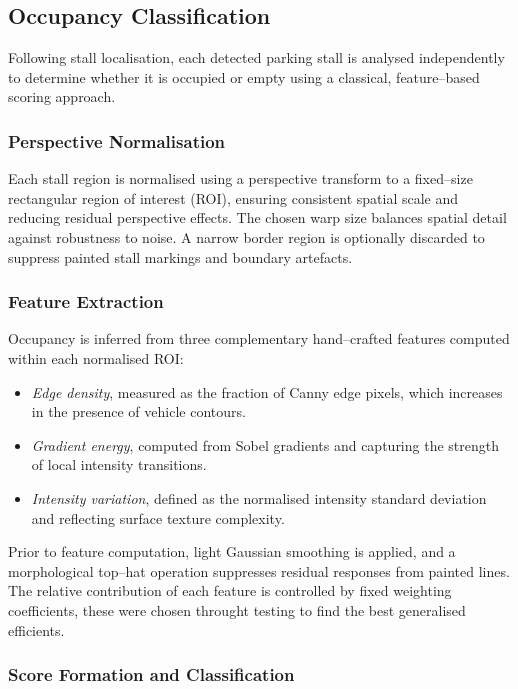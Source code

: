\documentclass[9pt,journal]{IEEEtran}
\begin{document}
	\subsection{Occupancy Classification}
	\label{sec:occupancy}
	
	Following stall localisation, each detected parking stall is analysed independently to determine whether it is occupied or empty using a classical, feature--based scoring approach.
	
	\subsubsection{Perspective Normalisation}
	
	Each stall region is normalised using a perspective transform to a fixed--size rectangular region of interest (ROI), ensuring consistent spatial scale and reducing residual perspective effects. The chosen warp size balances spatial
	detail against robustness to noise. A narrow border region is optionally discarded to suppress painted stall markings and boundary artefacts.
	
	\subsubsection{Feature Extraction}
	
	Occupancy is inferred from three complementary hand--crafted features computed within each normalised ROI:
	\begin{itemize}
		\item \emph{Edge density}, measured as the fraction of Canny edge pixels, which increases in the presence of vehicle contours.
		\item \emph{Gradient energy}, computed from Sobel gradients and capturing the strength of local intensity transitions.
		\item \emph{Intensity variation}, defined as the normalised intensity standard deviation and reflecting surface texture complexity.
	\end{itemize}
	
	Prior to feature computation, light Gaussian smoothing is applied, and a morphological top--hat operation suppresses residual responses from painted lines. The relative contribution of each feature is controlled by fixed weighting coefficients, these were chosen throught testing to find the best generalised efficients.
	
	\subsubsection{Score Formation and Classification}
	
\end{document}
